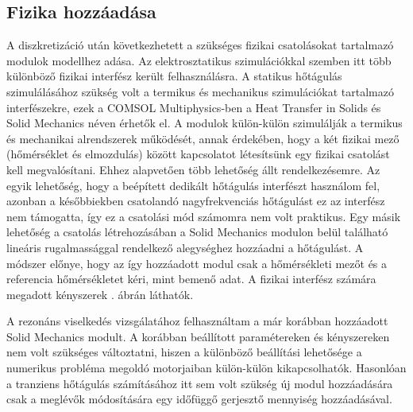 \subsection{Fizika hozzáadása}

A diszkretizáció után következhetett a szükséges fizikai csatolásokat tartalmazó modulok modellhez adása. Az elektrosztatikus szimulációkkal szemben itt több különböző fizikai interfész került felhasználásra. A statikus hőtágulás szimulálásához szükség volt a termikus és mechanikus szimulációkat tartalmazó interfészekre, ezek a COMSOL Multiphysics-ben a Heat Transfer in Solids és Solid Mechanics néven érhetők el. A modulok külön-külön szimulálják a termikus és mechanikai alrendszerek működését, annak érdekében, hogy a két fizikai mező (hőmérséklet és elmozdulás) között kapcsolatot létesítsünk egy fizikai csatolást kell megvalósítani. Ehhez alapvetően több lehetőség állt rendelkezésemre. Az egyik lehetőség, hogy a beépített dedikált hőtágulás interfészt használom fel, azonban a későbbiekben csatolandó nagyfrekvenciás hőtágulást ez az interfész nem támogatta, így ez a csatolási mód számomra nem volt praktikus. Egy másik lehetőség a csatolás létrehozásában a Solid Mechanics modulon belül található lineáris rugalmassággal rendelkező alegységhez hozzáadni a hőtágulást. A módszer előnye, hogy az így hozzáadott modul csak a hőmérsékleti mezőt és a referencia hőmérsékletet kéri, mint bemenő adat. A fizikai interfész számára megadott kényszerek . ábrán láthatók.

A rezonáns viselkedés vizsgálatához felhasználtam a már korábban hozzáadott Solid Mechanics modult. A korábban beállított paramétereken és kényszereken nem volt szükséges változtatni, hiszen a különböző beállítási lehetősége a numerikus probléma megoldó motorjaiban külön-külön kikapcsolhatók. Hasonlóan a tranziens hőtágulás számításához itt sem volt szükség új modul hozzáadására csak a meglévők módosítására egy időfüggő gerjesztő mennyiség hozzáadásával.

